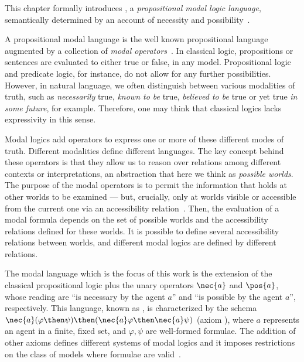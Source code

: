 This chapter formally introduces , a \emph{propositional modal
logic language}, semantically determined by an account of necessity and
possibility~\cite{journals/jal/NalonD07}.

A propositional modal language is the well known propositional language augmented
by a collection of \emph{modal operators}~\cite{blackburn2002modal}. In
classical logic, propositions or sentences are evaluated to either true or
false, in any model. Propositional logic and predicate logic, for instance, do
not allow for any further possibilities. However, in natural language, we often
distinguish between various modalities of truth, such as \emph{necessarily}
true, \emph{known to be} true, \emph{believed to be} true or yet true \emph{in
some future}, for example.  Therefore, one may think that classical logics lacks
expressivity in this sense. 

Modal logics add operators to express one or more of these different modes of
truth. Different modalities define different languages. The key concept behind
these operators is that they allow us to reason over relations among different
contexts or interpretations, an abstraction that here we think as \emph{possible
worlds}.  The purpose of the modal operators is to permit the information that
holds at other worlds to be examined --- but, crucially, only at worlds visible
or accessible from the current one via an accessibility
relation~\cite{blackburn2002modal}. Then, the evaluation of a modal formula
depends on the set of possible worlds and the accessibility relations defined
for these worlds. It is possible to define several accessibility relations
between worlds, and different modal logics are defined by different relations.

The modal language which is the focus of this work is the extension of the
classical propositional logic plus the unary operators $\nec{a}$ and
$\pos{a}$, whose reading are ``is necessary by the agent $a$'' and ``is
possible by the agent $a$'', respectively. This language, known as
, is characterized by the schema $\nec{a}(\varphi \then \psi) \then
(\nec{a} \varphi \then \nec{a} \psi)$ (axiom ), where $a$
represents an agent in a finite, fixed set, and $\varphi, \psi$ are well-formed
formulae. The addition of other axioms defines different systems of modal logics
and it imposes restrictions on the class of models where formulae are
valid~\cite{chellas:modal_logic}. 


